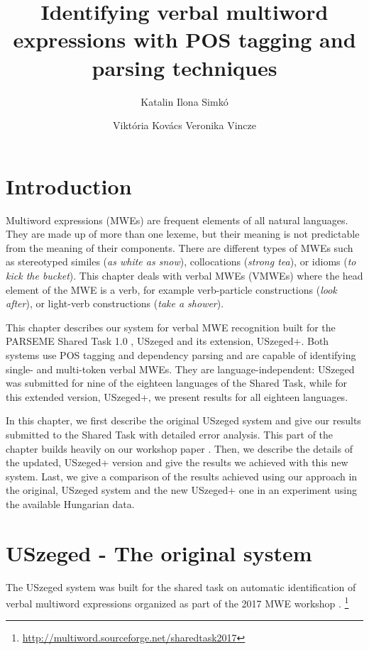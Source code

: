 \documentclass[output=paper,
modfonts,
]{langscibook}
\title{Identifying verbal multiword expressions with POS tagging and parsing techniques}
\author{
 Katalin Ilona Simkó\affiliation{University of Szeged}\and 
 Viktória Kovács\affiliation{University of Szeged}\lastand 
 Veronika Vincze\affiliation{University of Szeged\\MTA-SZTE Research Group on Artificial Intelligence}
}
\begin{document}
\maketitle
\label{SIMKO-CHAPTER}

\section{Introduction} 
Multiword expressions (MWEs) are frequent elements of all natural languages. They are made up of more than one lexeme, but their meaning is not predictable from the meaning of their components. There are different types of MWEs such as stereotyped similes (\textit{as white as snow}), collocations (\textit{strong tea}), or idioms (\textit{to kick the bucket}). This chapter deals with verbal MWEs (VMWEs) where the head element of the MWE is a verb, for example verb-particle constructions (\textit{look after}), or light-verb constructions (\textit{take a shower}). 

This chapter describes our system for verbal MWE recognition built for the PARSEME Shared Task 1.0 \citep{MWEWorkshop}, USzeged
and its extension, USzeged+. Both systems use POS tagging and dependency parsing and are capable of identifying single- and multi-token verbal MWEs. They are language-independent: USzeged was submitted for nine of the eighteen languages of the Shared Task, while for this extended version, USzeged+, we present results for all eighteen languages. 

In this chapter, we first describe the original USzeged system and give our results submitted to the Shared Task with detailed error analysis. This part of the chapter builds heavily on our workshop paper \citep{Simko2017}. Then, we describe the details of the updated, USzeged+ version and give the results we achieved with this new system. Last, we give a comparison of the results achieved using our approach in the original, USzeged system and the new USzeged+ one in an experiment using the available Hungarian data.

\section{USzeged - The original system}

The USzeged system was built for the shared task on automatic identification of verbal multiword expressions organized as part of the 2017 MWE workshop \citep{MWEWorkshop}. \footnote{\url{http://multiword.sourceforge.net/sharedtask2017}}
\end{document}
